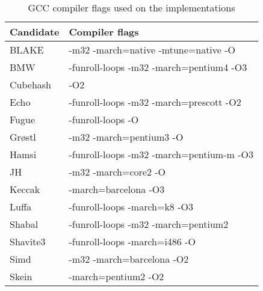 \begin{table}
  \centering
  \begin{tabular}{ | l | l | }
    \hline
    \textbf{Candidate} & \textbf{Compiler flags}            \\ \hline
     BLAKE       & -m32 -march=native -mtune=native -O      \\ \hline
     \ac{BMW}    & -funroll-loops -m32 -march=pentium4 -O3  \\ \hline
     Cubehash    & -O2                                      \\ \hline
     Echo        & -funroll-loops -m32 -march=prescott -O2  \\ \hline
     Fugue       & -funroll-loops -O                        \\ \hline
     Grøstl      & -m32 -march=pentium3 -O                  \\ \hline
     Hamsi       & -funroll-loops -m32 -march=pentium-m -O3 \\ \hline
     JH          & -m32 -march=core2 -O                     \\ \hline
     Keccak      & -march=barcelona -O3                     \\ \hline
     Luffa       & -funroll-loops -march=k8 -O3             \\ \hline
     Shabal      & -funroll-loops -m32 -march=pentium2      \\ \hline
     Shavite3    & -funroll-loops -march=i486 -O            \\ \hline
     Simd        & -m32 -march=barcelona -O2                \\ \hline
     Skein       & -march=pentium2 -O2                      \\ \hline
  \end{tabular}
  \caption{GCC compiler flags used on the implementations}
  \label{tbl:sha3:compilerflags}
\end{table}
